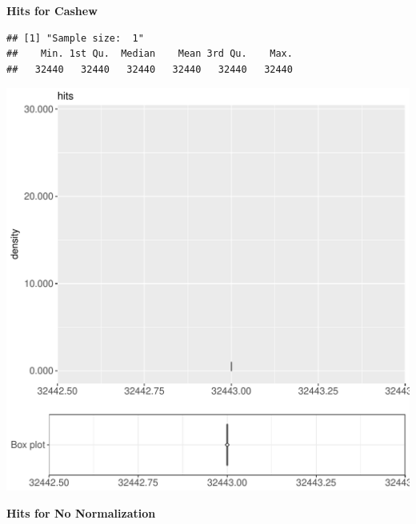 \documentclass{article}\usepackage[]{graphicx}\usepackage[]{color}
\makeatletter
\def\maxwidth{ %
  \ifdim\Gin@nat@width>\linewidth
    \linewidth
  \else
    \Gin@nat@width
  \fi
}
\newenvironment{kframe}{%
 \def\at@end@of@kframe{}%
 \ifinner\ifhmode%
  \def\at@end@of@kframe{\end{minipage}}%
  \begin{minipage}{\columnwidth}%
 \fi\fi%
 \def\FrameCommand##1{\hskip\@totalleftmargin \hskip-\fboxsep
 \colorbox{shadecolor}{##1}\hskip-\fboxsep
     \hskip-\linewidth \hskip-\@totalleftmargin \hskip\columnwidth}%
 \MakeFramed {\advance\hsize-\width
   \@totalleftmargin\z@ \linewidth\hsize
   \@setminipage}}%
 {\par\unskip\endMakeFramed%
 \at@end@of@kframe}
\newenvironment{knitrout}{}{} %
\makeatother
\begin{document}
 \textbf{Hits for Cashew}
\begin{knitrout}
\color{fgcolor}\begin{kframe}
\begin{verbatim}
## [1] "Sample size:  1"
##    Min. 1st Qu.  Median    Mean 3rd Qu.    Max. 
##   32440   32440   32440   32440   32440   32440
\end{verbatim}


{\ttfamily\noindent\bfseries{}}\end{kframe}
\includegraphics[width=\maxwidth]{figure/RH3_cashew_obscure-1} 

\end{knitrout}
 \textbf{Hits for No Normalization}
\end{document}
